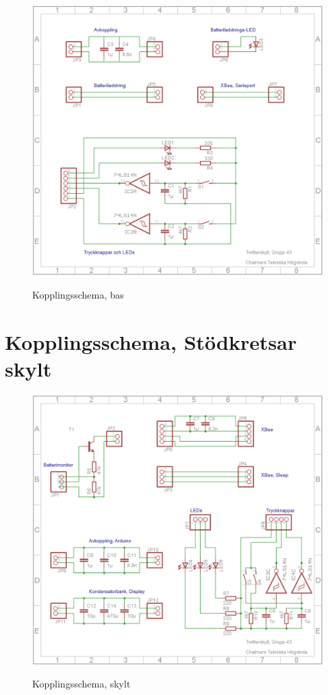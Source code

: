 \documentclass[a4paper,11pt]{article}
\begin{document}
\begin{figure}[H]
\includegraphics[scale=1.0, angle=0]{sch_bas.png}
\label{fig:block_skylt}
\caption{Kopplingsschema, bas}
\end{figure}
\pagebreak

\section{Kopplingsschema, Stödkretsar skylt}

\begin{figure}[H]
\includegraphics[scale=1.0, angle=0]{sch_skylt.png}
\label{fig:block_skylt}
\caption{Kopplingsschema, skylt}
\end{figure}
\pagebreak
\end{document}
